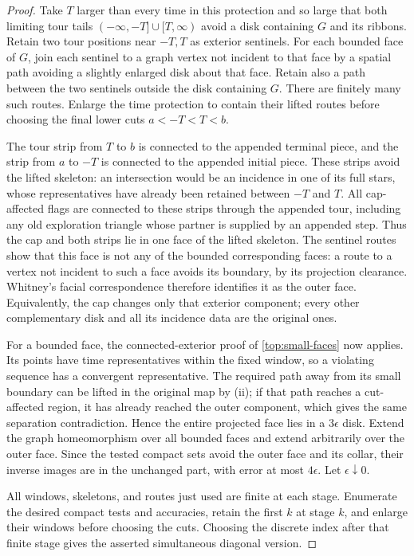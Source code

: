 \begin{proof}
Take $T$ larger than every time in this protection and so large that
both limiting tour tails $(-\infty,-T]\cup[T,\infty)$ avoid a disk
containing $G$ and its ribbons.  Retain two tour positions near
$-T,T$ as exterior sentinels.  For each bounded face of $G$, join each
sentinel to a graph vertex not incident to that face by a spatial
path avoiding a slightly enlarged disk about that face.  Retain also
a path between the two sentinels outside the disk containing $G$.
There are finitely many such routes.  Enlarge the time protection
to contain their lifted routes before choosing the final lower
cuts $a<-T<T<b$.

The tour strip from $T$ to $b$ is connected to the appended terminal
piece, and the strip from $a$ to $-T$ is connected to the appended
initial piece.  These strips avoid the lifted skeleton: an
intersection would be an incidence in one of its full stars, whose
representatives have already been retained between $-T$ and $T$.
All cap-affected flags are connected to these strips through the
appended tour, including any old exploration triangle whose partner
is supplied by an appended step.  Thus the cap and both strips lie
in one face of the lifted skeleton.  The sentinel routes show that
this face is not any of the bounded corresponding faces: a route
to a vertex not incident to such a face avoids its boundary, by its
projection clearance.  Whitney's facial correspondence therefore
identifies it as the outer face.  Equivalently, the cap changes
only that exterior component; every other complementary disk and
all its incidence data are the original ones.

For a bounded face, the connected-exterior proof of
\eqref{top:small-faces} now applies.  Its points have time
representatives within the fixed window, so a violating sequence
has a convergent representative.  The required path away from its
small boundary can be lifted in the original map by (ii); if that
path reaches a cut-affected region, it has already reached the outer
component, which gives the same separation contradiction.  Hence
the entire projected face lies in a $3\epsilon$ disk.  Extend the
graph homeomorphism over all bounded faces and extend arbitrarily
over the outer face.  Since the tested compact sets avoid the
outer face and its collar, their inverse images are in the unchanged
part, with error at most $4\epsilon$.  Let $\epsilon\downarrow0$.

All windows, skeletons, and routes just used are finite at each
stage.  Enumerate the desired compact tests and accuracies, retain
the first $k$ at stage $k$, and enlarge their windows before choosing
the cuts.  Choosing the discrete index after that finite stage
gives the asserted simultaneous diagonal version.
\end{proof}

